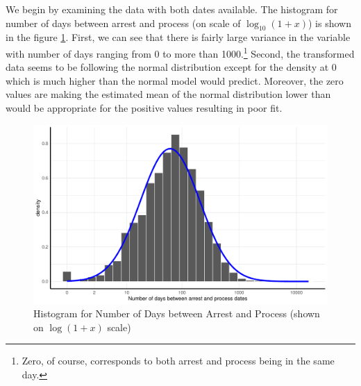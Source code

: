 We begin by examining the data with both dates available. 
The histogram for number of days between arrest and process (on scale of $\log_{10}(1 + x)$) is shown in the figure \ref{fig:simple_lm_hist}. First, we can see that there is fairly large variance in the variable with   number of days ranging from 0 to more than 1000.\footnote{Zero, of course, corresponds to both arrest and process being in the same day.}  Second, the transformed data seems to be following the normal distribution except for the density at 0
 which is much higher than the normal model would predict. Moreover, the  zero values are making the estimated mean of the normal distribution lower than would be appropriate for the positive values resulting in poor fit. 

 \begin{figure}[h]
\centering
\includegraphics[width=\textwidth]{plots/imputing_arrest_date/simple_lm_hist.pdf}
\caption{Histogram for Number of Days between Arrest and Process (shown on $\log(1 + x)$ scale)}
\label{fig:simple_lm_hist}
\end{figure}

